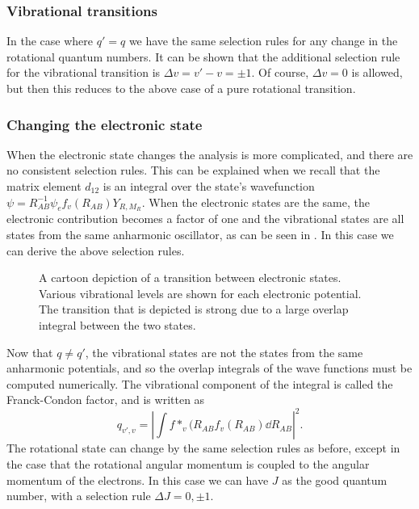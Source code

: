 \subsubsection{Vibrational transitions}

In the case where $q'=q$ we have the same selection rules for any change in the
rotational quantum numbers. It can be shown that the additional selection rule
for the vibrational transition is $\Delta v = v' - v = \pm 1$. Of course,
$\Delta v = 0$ is allowed, but then this reduces to the above case of a pure
rotational transition.

\subsubsection{Changing the electronic state}

When the electronic state changes the analysis is more complicated, and there
are no consistent selection rules. This can be explained when we recall that
the matrix element $d_{12}$ is an integral over the state's wavefunction $\psi
= R_{AB}^{-1}\psi_ef_v(R_{AB}) Y_{R, M_R}$. When the
electronic states are the same, the electronic contribution becomes a factor of
one and the vibrational states are all states from the same anharmonic
oscillator, as can be seen in . In this case we
can derive the above selection rules.

\begin{figure}
  \centering
  \caption{
    A cartoon depiction of a transition between electronic states. Various
    vibrational levels are shown for each electronic potential. The transition
    that is depicted is strong due to a large overlap integral between the two
    states.
  }
  \label{theory:fig:vibtrans}
\end{figure}

Now that $q\neq q'$, the vibrational states are not the states from the same
anharmonic potentials, and so the overlap integrals of the wave functions must
be computed numerically. The vibrational component of the integral is called
the Franck-Condon factor, and is written as
%
\begin{equation}
  q_{v',v} = \left|\int f*_v(R_{AB}f_v(R_{AB})\dd R_{AB}\right|^2.
\end{equation}
%
The rotational state can change by the same selection rules as before, except
in the case that the rotational angular momentum is coupled to the angular
momentum of the electrons. In this case we can have $J$ as the good quantum
number, with a selection rule $\Delta J = 0, \pm1$.


